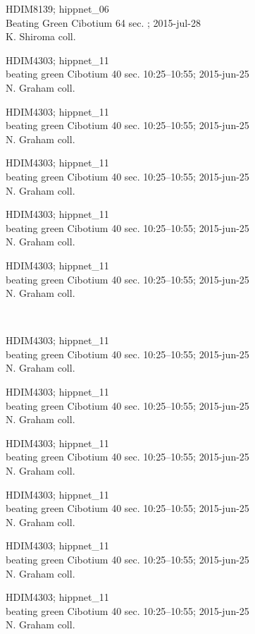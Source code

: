 \documentclass[2pt]{extarticle}
\begin{document}
\noindent
\parbox{0.16\textwidth}{\tiny \raggedright \rule[-0.3\baselineskip]{0pt}{10pt}HDIM8139; hippnet\_06\\ Beating Green Cibotium 64 sec. ; 2015-jul-28\\ K. Shiroma coll.}
\parbox{0.16\textwidth}{\tiny \raggedright \rule[-0.3\baselineskip]{0pt}{10pt}HDIM4303; hippnet\_11\\ beating green Cibotium 40 sec. 10:25--10:55; 2015-jun-25\\ N. Graham coll.}
\parbox{0.16\textwidth}{\tiny \raggedright \rule[-0.3\baselineskip]{0pt}{10pt}HDIM4303; hippnet\_11\\ beating green Cibotium 40 sec. 10:25--10:55; 2015-jun-25\\ N. Graham coll.}
\parbox{0.16\textwidth}{\tiny \raggedright \rule[-0.3\baselineskip]{0pt}{10pt}HDIM4303; hippnet\_11\\ beating green Cibotium 40 sec. 10:25--10:55; 2015-jun-25\\ N. Graham coll.}
\parbox{0.16\textwidth}{\tiny \raggedright \rule[-0.3\baselineskip]{0pt}{10pt}HDIM4303; hippnet\_11\\ beating green Cibotium 40 sec. 10:25--10:55; 2015-jun-25\\ N. Graham coll.}
\parbox{0.16\textwidth}{\tiny \raggedright \rule[-0.3\baselineskip]{0pt}{10pt}HDIM4303; hippnet\_11\\ beating green Cibotium 40 sec. 10:25--10:55; 2015-jun-25\\ N. Graham coll.} \\ 
\vspace{0.001in} 

\noindent
\parbox{0.16\textwidth}{\tiny \raggedright \rule[-0.3\baselineskip]{0pt}{10pt}HDIM4303; hippnet\_11\\ beating green Cibotium 40 sec. 10:25--10:55; 2015-jun-25\\ N. Graham coll.}
\parbox{0.16\textwidth}{\tiny \raggedright \rule[-0.3\baselineskip]{0pt}{10pt}HDIM4303; hippnet\_11\\ beating green Cibotium 40 sec. 10:25--10:55; 2015-jun-25\\ N. Graham coll.}
\parbox{0.16\textwidth}{\tiny \raggedright \rule[-0.3\baselineskip]{0pt}{10pt}HDIM4303; hippnet\_11\\ beating green Cibotium 40 sec. 10:25--10:55; 2015-jun-25\\ N. Graham coll.}
\parbox{0.16\textwidth}{\tiny \raggedright \rule[-0.3\baselineskip]{0pt}{10pt}HDIM4303; hippnet\_11\\ beating green Cibotium 40 sec. 10:25--10:55; 2015-jun-25\\ N. Graham coll.}
\parbox{0.16\textwidth}{\tiny \raggedright \rule[-0.3\baselineskip]{0pt}{10pt}HDIM4303; hippnet\_11\\ beating green Cibotium 40 sec. 10:25--10:55; 2015-jun-25\\ N. Graham coll.}
\parbox{0.16\textwidth}{\tiny \raggedright \rule[-0.3\baselineskip]{0pt}{10pt}HDIM4303; hippnet\_11\\ beating green Cibotium 40 sec. 10:25--10:55; 2015-jun-25\\ N. Graham coll.} \\ 
\vspace{0.001in} 
\end{document}
